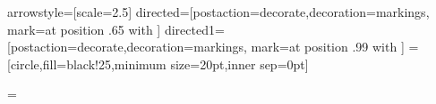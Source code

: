 \usepackage{graphicx}

\usepackage{epsfig}

\usepackage{mdwlist}

\usepackage{afterpage}
\usepackage{pagecolor}

\usepackage{hyperref}

 

\usepackage{tcolorbox}



\usepackage[framemethod=tikz]{mdframed}

\usepackage{emptypage}

\usepackage{rotating}
\usepackage{tikz}
\usetikzlibrary{calc,intersections,shapes.callouts}
\usetikzlibrary{decorations.text}
\usetikzlibrary{positioning}
\usetikzlibrary{decorations.pathreplacing}
\usetikzlibrary{shadows}
\usetikzlibrary{backgrounds}
\usepackage{circuitikz}
\tikzstyle arrowstyle=[scale=2.5]
\tikzstyle directed=[postaction={decorate,decoration={markings,
    mark=at position .65 with {}}}]
\tikzstyle directed1=[postaction={decorate,decoration={markings,
    mark=at position .99 with {}}}]   
=[circle,fill=black!25,minimum size=20pt,inner sep=0pt]


\pdfpageheight=\paperheight 

\usepackage{pgfplots}
\usepackage{pgfplotstable}

\usepackage{fancyhdr}

\usepackage{answers}

\usepackage[explicit,sc,nobottomtitles]{titlesec}




